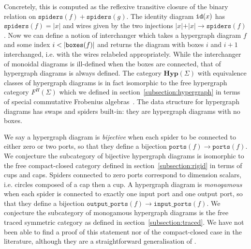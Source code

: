 Concretely, this is computed as the reflexive transitive closure of the binary relation on $\mathtt{spiders}(f) + \mathtt{spiders}(g)$.
The identity diagram $\mathtt{id}(x)$ has $\mathtt{spiders}(f) = \vert x \vert$ and wires given by the two injections $\vert x \vert + \vert x \vert \to \mathtt{spiders}(f)$.
Now we can define a notion of interchanger which takes a hypergraph diagram $f$ and some index $i < \vert \mathtt{boxes}(f) \vert$ and returns the diagram with boxes $i$ and $i + 1$ interchanged, i.e. with the wires relabeled appropriately.
While the interchanger of monoidal diagrams is ill-defined when the boxes are connected, that of hypergraph diagrams is always defined.
The category $\mathbf{Hyp}(\Sigma)$ with equivalence classes of hypergraph diagrams is in fact isomorphic to the free hypergraph category $F^H(\Sigma)$ which we defined in section~\ref{subsection:hypergraph} in terms of special commutative Frobenius algebras~\cite[Theorem 3.3]{BonchiEtAl16}.
The data structure for hypergraph diagrams has swaps and spiders built-in: they are hypergraph diagrams with no boxes.

We say a hypergraph diagram is \emph{bijective} when each spider to be connected to either zero or two ports, so that they define a bijection $\mathtt{ports}(f) \to \mathtt{ports}(f)$.
We conjecture the subcategory of bijective hypergraph diagrams is isomorphic to the free compact-closed category defined in section~\ref{subsection:rigid} in terms of cups and caps.
Spiders connected to zero ports correspond to dimension scalars, i.e. circles composed of a cap then a cup.
A hypergraph diagram is \emph{monogamous} when each spider is connected to exactly one input port and one output port, so that they define a bijection $\mathtt{output\_ports}(f) \to \mathtt{input\_ports}(f)$.
We conjecture the subcategory of monogamous hypergraph diagrams is the free traced symmetric category as defined in section~\ref{subsection:traced}.
We have not been able to find a proof of this statement nor of the compact-closed case in the literature, although they are a straightforward generalisation of \cite[Theorem 3.3]{BonchiEtAl16}.

